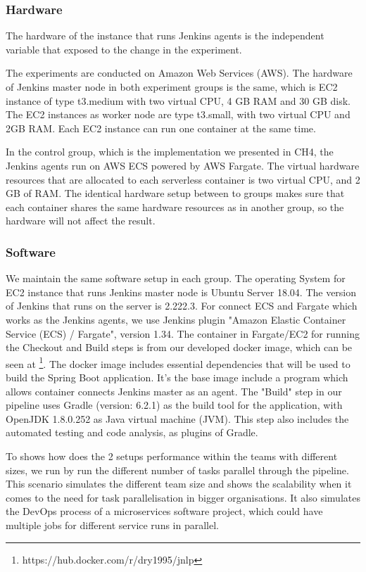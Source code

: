 \subsubsection{Hardware}
The hardware of the instance that runs Jenkins agents is the independent variable that exposed to the change in the experiment.
\par
The experiments are conducted on Amazon Web Services (AWS). The hardware of Jenkins master node in both experiment groups is the same, which is EC2 instance of type t3.medium with two virtual CPU, 4 GB RAM and 30 GB disk. The EC2 instances as worker node are type t3.small, with two virtual CPU and 2GB RAM. Each EC2 instance can run one container at the same time.
\par
In the control group, which is the implementation we presented in CH4, the Jenkins agents run on AWS ECS powered by AWS Fargate. The virtual hardware resources that are allocated to each serverless container is two virtual CPU, and 2 GB of RAM. The identical hardware setup between to groups makes sure that each container shares the same hardware resources as in another group, so the hardware will not affect the result.
\subsubsection{Software}
We maintain the same software setup in each group. The operating System for EC2 instance that runs Jenkins master node is Ubuntu Server 18.04. The version of Jenkins that runs on the server is 2.222.3. For connect ECS and Fargate which works as the Jenkins agents, we use Jenkins plugin "Amazon Elastic Container Service (ECS) / Fargate", version 1.34. The container in Fargate/EC2 for running the Checkout and Build steps is from our developed docker image, which can be seen at \footnote{https://hub.docker.com/r/dry1995/jnlp}. The docker image includes essential dependencies that will be used to build the Spring Boot application. It's the base image include a program which allows container connects Jenkins master as an agent. The "Build" step in our pipeline uses Gradle (version: 6.2.1) as the build tool for the application,
with OpenJDK 1.8.0.252 as Java virtual machine (JVM).
This step also includes the automated testing and code analysis, as plugins of Gradle. 
\par
To shows how does the 2 setups performance within the teams with different sizes, we run by run the different number of tasks parallel through the pipeline. This scenario simulates the different team size and shows the scalability when it comes to the need for task parallelisation in bigger organisations. It also simulates the DevOps process of a microservices software project, which could have multiple jobs for different service runs in parallel.

